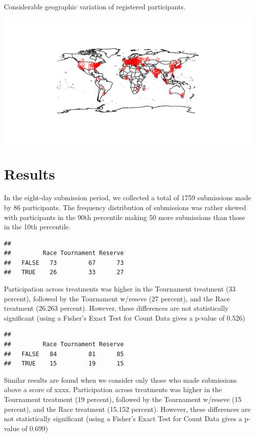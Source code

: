 \documentclass[12pt,]{article}
\begin{document}
Considerable geographic variation of registered participants.

\includegraphics{Figures/unnamed-chunk-10-1.pdf}

\clearpage

\section{Results}\label{results}

In the eight-day submission period, we collected a total of 1759
submissions made by 86 participants. The frequency distribution of
submissions was rather skewed with participants in the 90th percentile
making 50 more submissions than those in the 10th percentile.

\begin{verbatim}
##        
##         Race Tournament Reserve
##   FALSE   73         67      73
##   TRUE    26         33      27
\end{verbatim}

Participation across treatments was higher in the Tournament treatment
(33 percent), followed by the Tournament w/reseve (27 percent), and the
Race treatment (26.263 percent). However, these differences are not
statistically significant (using a Fisher's Exact Test for Count Data
gives a p-value of 0.526)

\begin{verbatim}
##        
##         Race Tournament Reserve
##   FALSE   84         81      85
##   TRUE    15         19      15
\end{verbatim}

Similar results are found when we consider only those who made
submissions above a score of xxxx. Participation across treatments was
higher in the Tournament treatment (19 percent), followed by the
Tournament w/reseve (15 percent), and the Race treatment (15.152
percent). However, these differences are not statistically significant
(using a Fisher's Exact Test for Count Data gives a p-value of 0.699)
\end{document}
